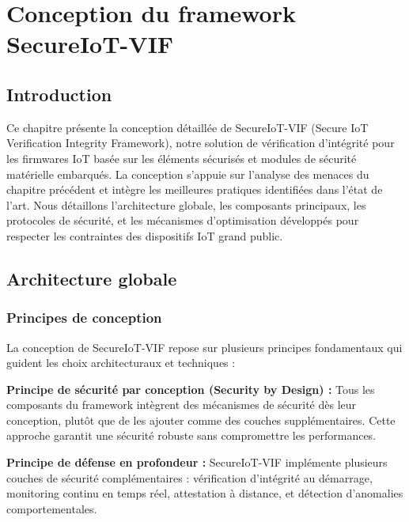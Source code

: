 
\chapter{Conception du framework SecureIoT-VIF}
\label{chap:framework-design}

\section{Introduction}

Ce chapitre présente la conception détaillée de SecureIoT-VIF (Secure IoT Verification Integrity Framework), notre solution de vérification d'intégrité pour les firmwares IoT basée sur les éléments sécurisés et modules de sécurité matérielle embarqués. La conception s'appuie sur l'analyse des menaces du chapitre précédent et intègre les meilleures pratiques identifiées dans l'état de l'art. Nous détaillons l'architecture globale, les composants principaux, les protocoles de sécurité, et les mécanismes d'optimisation développés pour respecter les contraintes des dispositifs IoT grand public.

\section{Architecture globale}

\subsection{Principes de conception}

La conception de SecureIoT-VIF repose sur plusieurs principes fondamentaux qui guident les choix architecturaux et techniques :

\textbf{Principe de sécurité par conception (Security by Design) :} Tous les composants du framework intègrent des mécanismes de sécurité dès leur conception, plutôt que de les ajouter comme des couches supplémentaires. Cette approche garantit une sécurité robuste sans compromettre les performances.

\textbf{Principe de défense en profondeur :} SecureIoT-VIF implémente plusieurs couches de sécurité complémentaires : vérification d'intégrité au démarrage, monitoring continu en temps réel, attestation à distance, et détection d'anomalies comportementales.

